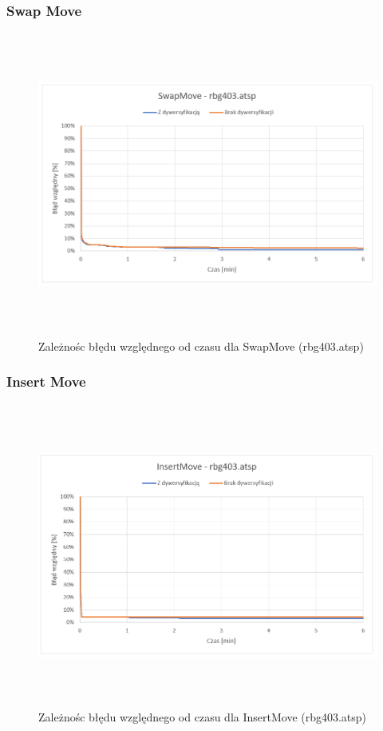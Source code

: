 \documentclass[a4paper,11pt]{article}
\begin{document}
\subsubsection{Swap Move}

\begin{figure}[H]
\centering
\includegraphics[height=10cm]{SwapMove403.PNG}
\caption{Zależnośc błędu względnego od czasu dla SwapMove (rbg403.atsp)}
\end{figure}

\subsubsection{Insert Move}

\begin{figure}[H]
\centering
\includegraphics[height=10cm]{InsertMove403.PNG}
\caption{Zależnośc błędu względnego od czasu dla InsertMove (rbg403.atsp)}
\end{figure}
\end{document}
